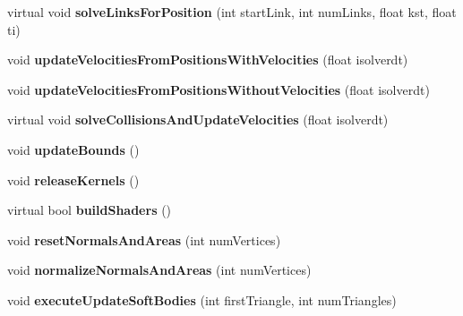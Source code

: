 \begin{DoxyCompactItemize}
virtual void {\bfseries solve\+Links\+For\+Position} (int start\+Link, int num\+Links, float kst, float ti)
\item 
\mbox{\label{classbtOpenCLSoftBodySolver_a20ce37361e0082884415ca2c3067a31c}} 
void {\bfseries update\+Velocities\+From\+Positions\+With\+Velocities} (float isolverdt)
\item 
\mbox{\label{classbtOpenCLSoftBodySolver_a7ec6d83da33181aefe0d1fe49fcad792}} 
void {\bfseries update\+Velocities\+From\+Positions\+Without\+Velocities} (float isolverdt)
\item 
\mbox{\label{classbtOpenCLSoftBodySolver_affca09683875b98e3f691ab05118c12a}} 
virtual void {\bfseries solve\+Collisions\+And\+Update\+Velocities} (float isolverdt)
\item 
\mbox{\label{classbtOpenCLSoftBodySolver_a46f876bcacba9b8d4b08b52508c407e7}} 
void {\bfseries update\+Bounds} ()
\item 
\mbox{\label{classbtOpenCLSoftBodySolver_a6f5a41ef99b636508c67e1de1083902f}} 
void {\bfseries release\+Kernels} ()
\item 
\mbox{\label{classbtOpenCLSoftBodySolver_aa0904853f6aeda611c23447d125f63ca}} 
virtual bool {\bfseries build\+Shaders} ()
\item 
\mbox{\label{classbtOpenCLSoftBodySolver_a4de74e7bf2cd5f5a1dee373ded831844}} 
void {\bfseries reset\+Normals\+And\+Areas} (int num\+Vertices)
\item 
\mbox{\label{classbtOpenCLSoftBodySolver_aa96d60579ded5de8db6840ff09989b7d}} 
void {\bfseries normalize\+Normals\+And\+Areas} (int num\+Vertices)
\item 
\mbox{\label{classbtOpenCLSoftBodySolver_af4d900b86735ba975e04cf5111aa1e60}} 
void {\bfseries execute\+Update\+Soft\+Bodies} (int first\+Triangle, int num\+Triangles)
\item 
\mbox{\label{classbtOpenCLSoftBodySolver_a4c04cb2b16b762c4768304218c664470}} 

\end{DoxyCompactItemize}
